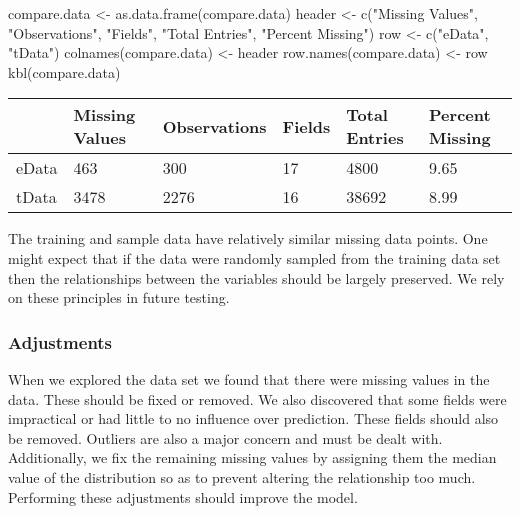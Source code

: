 \documentclass[
]{article}
\newenvironment{Shaded}{\begin{snugshade}}{\end{snugshade}}
\newcommand{\FunctionTok}[1]{\textcolor[rgb]{0.00,0.00,0.00}{#1}}
\newcommand{\NormalTok}[1]{#1}
\newcommand{\OtherTok}[1]{\textcolor[rgb]{0.56,0.35,0.01}{#1}}
\newcommand{\StringTok}[1]{\textcolor[rgb]{0.31,0.60,0.02}{#1}}
\begin{document}
\begin{Shaded}
\begin{Highlighting}[]
\NormalTok{compare.data }\OtherTok{\textless{}{-}} \FunctionTok{as.data.frame}\NormalTok{(compare.data)}
\NormalTok{header }\OtherTok{\textless{}{-}} \FunctionTok{c}\NormalTok{(}\StringTok{"Missing Values"}\NormalTok{, }\StringTok{"Observations"}\NormalTok{, }\StringTok{"Fields"}\NormalTok{, }\StringTok{"Total Entries"}\NormalTok{, }\StringTok{"Percent Missing"}\NormalTok{)}
\NormalTok{row }\OtherTok{\textless{}{-}} \FunctionTok{c}\NormalTok{(}\StringTok{"eData"}\NormalTok{, }\StringTok{"tData"}\NormalTok{)}
\FunctionTok{colnames}\NormalTok{(compare.data) }\OtherTok{\textless{}{-}}\NormalTok{ header}
\FunctionTok{row.names}\NormalTok{(compare.data) }\OtherTok{\textless{}{-}}\NormalTok{ row }
\FunctionTok{kbl}\NormalTok{(compare.data)}
\end{Highlighting}
\end{Shaded}

\begin{tabular}[t]{l|l|l|l|l|l}
\hline
  & Missing Values & Observations & Fields & Total Entries & Percent Missing\\
\hline
eData & 463 & 300 & 17 & 4800 & 9.65\\
\hline
tData & 3478 & 2276 & 16 & 38692 & 8.99\\
\hline
\end{tabular}

The training and sample data have relatively similar missing data
points. One might expect that if the data were randomly sampled from the
training data set then the relationships between the variables should be
largely preserved. We rely on these principles in future testing.

\hypertarget{adjustments}{%
\subsubsection{Adjustments}\label{adjustments}}

When we explored the data set we found that there were missing values in
the data. These should be fixed or removed. We also discovered that some
fields were impractical or had little to no influence over prediction.
These fields should also be removed. Outliers are also a major concern
and must be dealt with. Additionally, we fix the remaining missing
values by assigning them the median value of the distribution so as to
prevent altering the relationship too much. Performing these adjustments
should improve the model.
\end{document}
